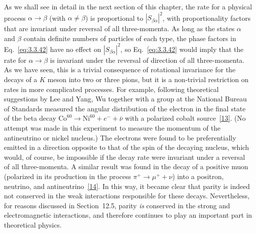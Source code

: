 As we shall see in detail in the next section of this chapter, the rate for a
physical process $\alpha\to\beta$ (with $\alpha\ne\beta$) is proportional to
$|S_{\beta\alpha}|^2$, with proportionality factors that are invariant under
reversal of all three-momenta. As long as the states $\alpha$ and $\beta$ contain
definite numbers of particles of each type, the phase factors in Eq.~\eqref{eq:3.3.42} have
no effect on $|S_{\beta\alpha}|^2$, so Eq.~\eqref{eq:3.3.42} would imply that the rate for
$\alpha\to\beta$ is invariant under the reversal of direction of all three-momenta.
As we have seen, this is a trivial consequence of rotational invariance for the
decays of a $K$ meson into two or three pions, but it is a non-trivial restriction
on rates in more complicated processes. For example, following theoretical
suggestions by Lee and Yang, Wu together with a group at the National Bureau of
Standards measured the angular distribution of the electron in the final state of
the beta decay $\mathrm{Co}^{60}\to\mathrm{Ni}^{60}+e^-+\bar\nu$ with a polarized
cobalt source~\hyperref[ref:3.13]{[13]}. (No attempt was made in this experiment to measure the momentum
of the antineutrino or nickel nucleus.) The electrons were found to be preferentially
emitted in a direction opposite to that of the spin of the decaying nucleus, which
would, of course, be impossible if the decay rate were invariant under a reversal of
all three-momenta. A similar result was found in the decay of a positive muon
(polarized in its production in the process $\pi^+\to\mu^++\nu$) into a positron,
neutrino, and antineutrino~\hyperref[ref:3.14]{[14]}. In this way, it became clear that parity is indeed
not conserved in the weak interactions responsible for these decays. Nevertheless,
for reasons discussed in Section~12.5, parity \textit{is} conserved in the strong
and electromagnetic interactions, and therefore continues to play an important
part in theoretical physics.

